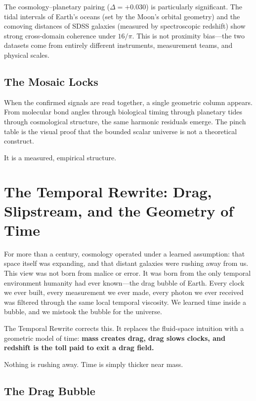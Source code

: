 \documentclass[11pt, letterpaper, openany]{book}
\begin{document}
The cosmology--planetary pairing ($\Delta = +0.030$) is particularly significant. The tidal
intervals of Earth's oceans (set by the Moon's orbital geometry) and the comoving distances
of SDSS galaxies (measured by spectroscopic redshift) show strong cross-domain coherence
under $16/\pi$. This is not proximity bias---the two datasets come from entirely different
instruments, measurement teams, and physical scales.

\section*{The Mosaic Locks}

When the confirmed signals are read together, a single geometric column appears. From
molecular bond angles through biological timing through planetary tides through cosmological
structure, the same harmonic residuals emerge. The pinch table is the visual proof that the
bounded scalar universe is not a theoretical construct.

It is a measured, empirical structure.

\chapter{The Temporal Rewrite: Drag, Slipstream, and the Geometry of Time}

For more than a century, cosmology operated under a learned assumption: that space itself was
expanding, and that distant galaxies were rushing away from us. This view was not born from
malice or error. It was born from the only temporal environment humanity had ever known---the
drag bubble of Earth. Every clock we ever built, every measurement we ever made, every photon
we ever received was filtered through the same local temporal viscosity. We learned time
inside a bubble, and we mistook the bubble for the universe.

The Temporal Rewrite corrects this.
It replaces the fluid-space intuition with a geometric model of time:
\textbf{mass creates drag, drag slows clocks, and redshift is the toll paid to exit a drag field.}

Nothing is rushing away.
Time is simply thicker near mass.

\section*{The Drag Bubble}
\end{document}
